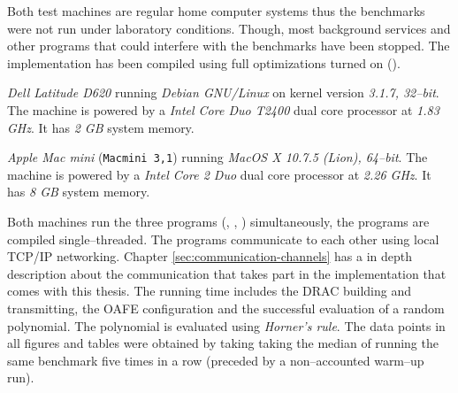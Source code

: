 \label{sec:evaluation}

\label{sec:test-setup}

\label{sec:test-machines}

Both test machines are regular home computer systems thus the benchmarks were
not run under laboratory conditions. Though, most background services and other
programs that could interfere with the benchmarks have been stopped. The
implementation has been compiled using full optimizations turned on
().



\emph{Dell Latitude D620} running \emph{Debian GNU/Linux} on kernel version
\emph{3.1.7, 32--bit}. The machine is powered by a \emph{Intel\TReg{} Core Duo
T2400} dual core processor at \emph{1.83 GHz}. It has \emph{2 GB} system memory.



\emph{Apple Mac mini} (\texttt{Macmini 3,1}) running \emph{MacOS X 10.7.5
(Lion), 64--bit}. The machine is powered by a \emph{Intel\TReg{} Core 2 Duo}
dual core processor at \emph{2.26 GHz}. It has \emph{8 GB} system memory.


Both machines run the three programs (\JWBpOne{}, \JWBpTwo{}, \JWBtoken{})
simultaneously, the programs are compiled single--threaded. The programs
communicate to each other using local TCP/IP networking. Chapter
\ref{sec:communication-channels} has a in depth description about the
communication that takes part in the implementation that comes with this thesis.
The running time includes the DRAC building and transmitting, the OAFE
configuration and the successful evaluation of a random polynomial. The
polynomial is evaluated using \emph{Horner's rule}\cite{cormen01}. The data
points in all figures and tables were obtained by taking taking the median of
running the same benchmark five times in a row (preceded by a non--accounted
warm--up run).


\label{sec:comp-complexity}

